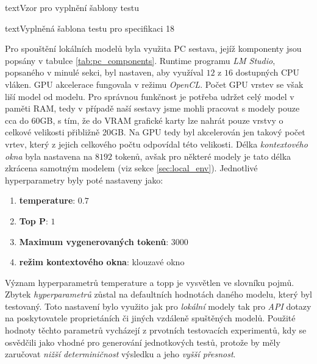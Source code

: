 \documentclass[czech, ma, kiv, he, iso690numb, pdf, viewonly]{fasthesis}
\begin{document}
\begin{code}{text}{Vzor pro vyplnění šablony testu \label{lst:template}}
{\begin{code}{text}{Vyplněná šablona testu pro specifikaci 18 \label{lst:spec18}}
{            Pro spouštění lokálních modelů byla využita PC sestava, jejíž komponenty jsou popsány v tabulce \ref{tab:pc_components}. Runtime programu \textit{LM Studio}, popsaného v minulé sekci, byl nastaven, aby využíval \(12\) z \(16\) dostupných CPU vláken. GPU akcelerace fungovala v režimu \textit{OpenCL}. Počet GPU vrstev se však liší model od modelu. Pro správnou funkčnost je potřeba udržet celý model v paměti RAM, tedy v případě naší sestavy jsme mohli pracovat s modely pouze cca do 60GB, s tím, že do VRAM grafické karty lze nahrát pouze vrstvy o celkové velikosti přibližně 20GB. Na GPU tedy byl akcelerován jen takový počet vrtev, který z jejich celkového počtu odpovídal této velikosti. Délka \textit{kontextového okna} byla nastavena na \(8 192\) \gls{token}ů, avšak pro některé modely je tato délka zkrácena samotným modelem (viz sekce \ref{sec:local_env}). Jednotlivé hyperparametry byly poté nastaveny jako:
            \begin{enumerate}
                \item \textbf{\gls{temperature}}: \(0.7\)
                \item \textbf{Top P}: \(1\)
                \item \textbf{Maximum vygenerovaných tokenů}: \(3000\)
                \item \textbf{režim kontextového okna}: klouzavé okno
            \end{enumerate}
            Význam hyperparametrů \gls{temperature} a \gls{topp} je vysvětlen ve slovníku pojmů. Zbytek \emph{hyperparametrů} zůstal na defaultních hodnotách daného modelu, který byl testovaný. Toto nastavení bylo využito jak pro \textit{lokální} modely tak pro \textit{API} dotazy na poskytovatele proprietáních či jiných vzdáleně spuštěných modelů. Použité hodnoty těchto parametrů vycházejí z prvotních testovacích experimentů, kdy se osvědčili jako vhodné pro generování jednotkových testů, protože by měly zaručovat \textit{nižší determiničnost} výsledku a jeho \textit{vyšší přesnost}.

}
\end{code}}
\end{code}
\end{document}
